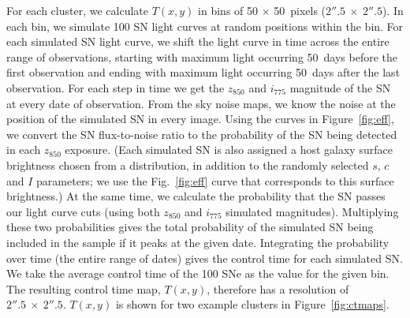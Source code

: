 For each cluster, we calculate $T(x,y)$ in bins of 50 $\times$
50~pixels ($2''.5\ \times\ 2''.5$). In each bin, we simulate 100 SN
light curves at random positions within the bin.  For each simulated
SN light curve, we shift the light curve in time across the entire
range of observations, starting with maximum light occurring 50~days
before the first observation and ending with maximum light occurring
50~days after the last observation. For each step in time we get the
$z_{850}$ and $i_{775}$ magnitude of the SN at every date of
observation. From the sky noise maps, we know the noise at the
position of the simulated SN in every image. Using the curves in
Figure~\ref{fig:eff}, we convert the SN flux-to-noise ratio to the
probability of the SN being detected in each $z_{850}$ exposure. (Each
simulated SN is also assigned a host galaxy surface brightness chosen
from a distribution, in addition to the randomly selected $s$, $c$ and
$I$ parameters; we use the Fig.~\ref{fig:eff} curve that corresponds
to this surface brightness.) At the same time, we calculate the
probability that the SN passes our light curve cuts (using both
$z_{850}$ and $i_{775}$ simulated magnitudes). Multiplying these two
probabilities gives the total probability of the simulated SN being
included in the sample if it peaks at the given date.  Integrating the
probability over time (the entire range of dates) gives the control
time for each simulated SN. We take the average control time of the
100 SNe as the value for the given bin. The resulting control time
map, $T(x,y)$, therefore has a resolution of $2''.5\ \times\
2''.5$. $T(x,y)$ is shown for two example clusters in
Figure~\ref{fig:ctmaps}.

